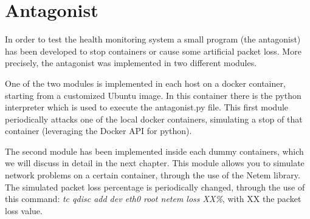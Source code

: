 \section{Antagonist}
In order to test the health monitoring system a small program (the antagonist) has been developed to stop containers or cause some artificial packet loss.
More precisely, the antagonist was implemented in two different modules. 

\noindent One of the two modules is implemented in each host on a docker container, starting from a customized Ubuntu image. In this container there is the python interpreter which is used to execute the antagonist.py file.
This first module periodically attacks one of the local docker containers, simulating a stop of that container (leveraging the Docker API for python).

\noindent The second module has been implemented inside each dummy containers, which we will discuss in detail in the next chapter. This module allows you to simulate network problems on a certain container, through the use of the Netem library. The simulated packet loss percentage is periodically changed, through the use of this command: \emph{tc qdisc add dev eth0 root netem loss XX\%}, with XX the packet loss value.